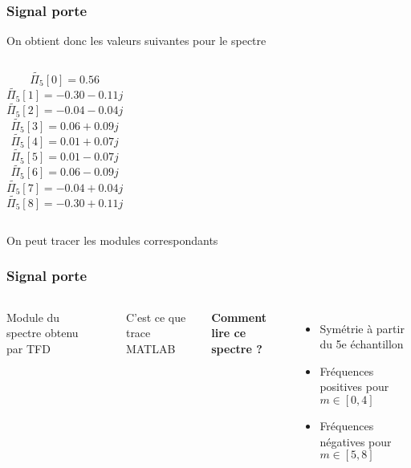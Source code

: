 \documentclass{beamer}
\begin{document}
\begin{frame}
\frametitle{Signal porte}
On obtient donc les valeurs suivantes pour le spectre 
\begin{columns}
\column{60mm}
\[  \tilde{\Pi_5}[0]  =  0.56 \]
\[  \tilde{\Pi_5}[1]  =   -0.30 - 0.11j \]
\[  \tilde{\Pi_5}[2]  =   -0.04 - 0.04j \]
\[ \tilde{\Pi_5}[3]  =   0.06 + 0.09j \]
\[ \tilde{\Pi_5}[4]  =   0.01 + 0.07j \]
\column{60mm}
\[ \tilde{\Pi_5}[5]  =   0.01 - 0.07j \]
\[ \tilde{\Pi_5}[6]  =   0.06 - 0.09j \]
\[  \tilde{\Pi_5}[7]  =   -0.04 + 0.04j \]
\[ \tilde{\Pi_5}[8]  =   -0.30 + 0.11j \]
\end{columns}
\vspace{0.5cm}
\begin{center}
On peut tracer les modules correspondants 
\end{center}
\end{frame}

\begin{frame}
\frametitle{Signal porte}
\begin{columns}
\column{60mm}
Module du spectre obtenu par TFD
\begin{center}
\end{center}
C'est ce que trace MATLAB

\column{60mm}
 {\textbf{Comment lire ce spectre ?}}\\
\vspace{0.2cm}
\begin{itemize}
\item<3-> Symétrie à partir du 5e échantillon
\item<4-> Fréquences positives pour $m \in [0,4]$
\item<5-> Fréquences négatives pour $m \in [5,8]$
\end{itemize}
\vspace{0.3cm} 
\end{columns}
\end{frame}
\end{document}
